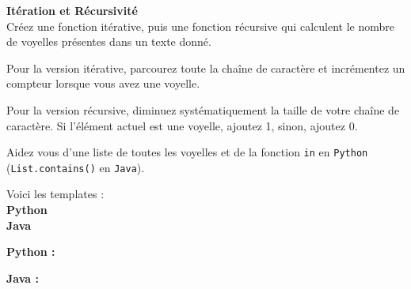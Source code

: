 \begin{Exercice}[15 minutes]\textbf{Itération et Récursivité} \\

Créez une fonction itérative, puis une fonction récursive qui calculent le nombre de voyelles présentes dans un texte donné. \\

\begin{conseil}
   Pour la version itérative, parcourez toute la chaîne de caractère et incrémentez un compteur lorsque vous avez une voyelle.
   
   Pour la version récursive, diminuez systématiquement la taille de votre chaîne de caractère. Si l'élément actuel est une voyelle, ajoutez 1, sinon, ajoutez 0.
   
   Aidez vous d'une liste de toutes les voyelles et de la fonction \lstinline{in} en \lstinline{Python} (\lstinline{List.contains()} en \lstinline{Java}).
\end{conseil}

Voici les templates : \\

\textbf{Python} \\

     

\textbf{Java} \\

    

    
\begin{solution}
\textbf{Python :} \\

    
    
\end{solution}


\begin{solution}   
\textbf{Java :} \\

    
    
    
    
\end{solution}

\end{Exercice}

